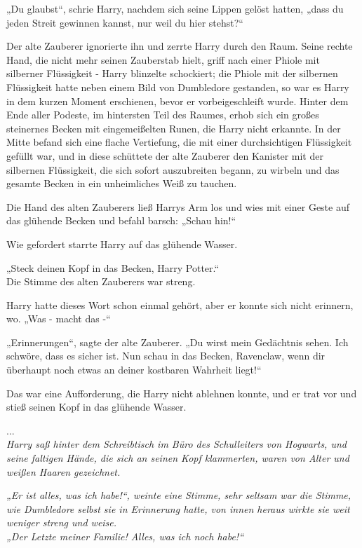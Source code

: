 {„Du glaubst“, schrie Harry, nachdem sich seine Lippen gelöst hatten, „dass du jeden Streit gewinnen kannst, nur weil du hier stehst?“

Der alte Zauberer ignorierte ihn und zerrte Harry durch den Raum. Seine rechte Hand, die nicht mehr seinen Zauberstab hielt, griff nach einer Phiole mit silberner Flüssigkeit - Harry blinzelte schockiert; die Phiole mit der silbernen Flüssigkeit hatte neben einem Bild von Dumbledore gestanden, so war es Harry in dem kurzen Moment erschienen, bevor er vorbeigeschleift wurde. Hinter dem Ende aller Podeste, im hintersten Teil des Raumes, erhob sich ein großes steinernes Becken mit eingemeißelten Runen, die Harry nicht erkannte. In der Mitte befand sich eine flache Vertiefung, die mit einer durchsichtigen Flüssigkeit gefüllt war, und in diese schüttete der alte Zauberer den Kanister mit der silbernen Flüssigkeit, die sich sofort auszubreiten begann, zu wirbeln und das gesamte Becken in ein unheimliches Weiß zu tauchen.

Die Hand des alten Zauberers ließ Harrys Arm los und wies mit einer Geste auf das glühende Becken und befahl barsch: „Schau hin!“

Wie gefordert starrte Harry auf das glühende Wasser.

„Steck deinen Kopf in das Becken, Harry Potter.“\\ Die Stimme des alten Zauberers war streng.

Harry hatte dieses Wort schon einmal gehört, aber er konnte sich nicht erinnern, wo. „Was - macht das -“

„Erinnerungen“, sagte der alte Zauberer. „Du wirst mein Gedächtnis sehen. Ich schwöre, dass es sicher ist. Nun schau in das Becken, Ravenclaw, wenn dir überhaupt noch etwas an deiner kostbaren Wahrheit liegt!“

Das war eine Aufforderung, die Harry nicht ablehnen konnte, und er trat vor und stieß seinen Kopf in das glühende Wasser.

...\\ \emph{Harry saß hinter dem Schreibtisch im Büro des Schulleiters von Hogwarts, und seine faltigen Hände, die sich an seinen Kopf klammerten, waren von Alter und weißen Haaren gezeichnet.}

\emph{„Er ist alles, was ich habe!“, weinte eine Stimme, sehr seltsam war die Stimme, wie Dumbledore selbst sie in Erinnerung hatte, von innen heraus wirkte sie weit weniger streng und weise.}\\ \emph{„Der Letzte meiner Familie! Alles, was ich noch habe!“}

}
